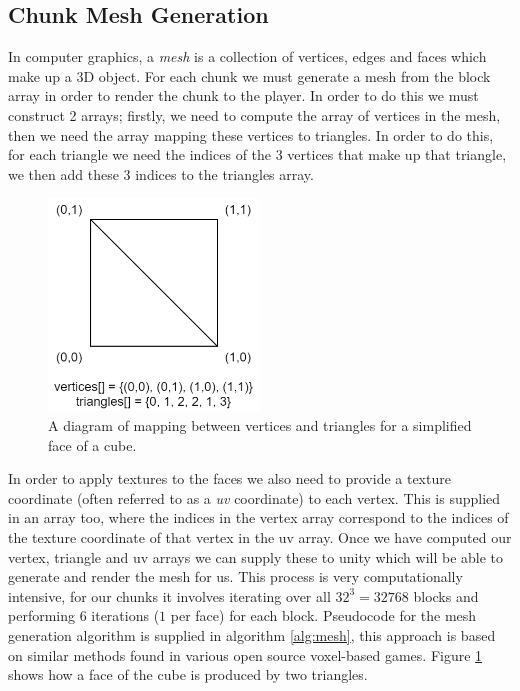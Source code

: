\documentclass[12pt,notitlepage,a4paper]{report}
\begin{document}
	\subsection{Chunk Mesh Generation}
	\label{sec:mesh}
	In computer graphics, a \emph{mesh} is a collection of vertices, edges and faces which make up a 3D object. For each chunk we must generate a mesh from the block array in order to render the chunk to the player. In order to do this we must construct 2 arrays; firstly, we need to compute the array of vertices in the mesh, then we need the array mapping these vertices to triangles. In order to do this, for each triangle we need the indices of the 3 vertices that make up that triangle, we then add these 3 indices to the triangles array.
	
	\begin{figure}
		\centering
		\includegraphics[width=0.5\textwidth]{diag2.png}
		\caption{A diagram of mapping between vertices and triangles for a simplified face of a cube.}
		\label{fig:mesh}
	\end{figure}
	
	In order to apply textures to the faces we also need to provide a texture coordinate (often referred to as a \emph{uv} coordinate) to each vertex. This is supplied in an array too, where the indices in the vertex array correspond to the indices of the texture coordinate of that vertex in the uv array. Once we have computed our vertex, triangle and uv arrays we can supply these to unity which will be able to generate and render the mesh for us. This process is very computationally intensive, for our chunks it involves iterating over all $32^3 = 32768$ blocks and performing $6$ iterations ($1$ per face) for each block. Pseudocode for the mesh generation algorithm is supplied in algorithm \ref{alg:mesh}, this approach is based on similar methods found in various open source voxel-based games. Figure \ref{fig:mesh} shows how a face of the cube is produced by two triangles.
	
\end{document}
